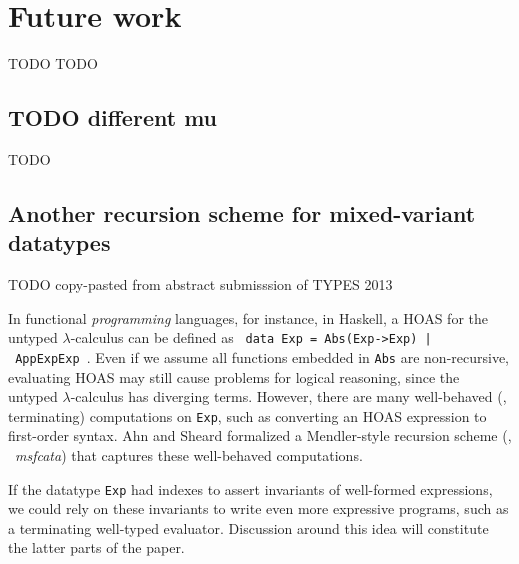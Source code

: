 \chapter{Future work}\label{ch:futwork} TODO
TODO


\section{TODO different mu}\label{sec:futwork:mu}
TODO

\section{Another recursion scheme for mixed-variant datatypes}
\label{sec:futwork:mprsi}
TODO copy-pasted from abstract submisssion of TYPES 2013

\newcommand{\mprsi}[0]{\textbf{mprsi}}

In functional \emph{programming} languages, for instance, in Haskell,
a HOAS for the untyped $\lambda$-calculus can be defined as
{\small\texttt{\,data Exp~=~Abs\;(Exp\;->\;Exp)~|~App\;Exp\;Exp\,}}.
Even if we assume all functions embedded in \texttt{Abs} are non-recursive,
evaluating HOAS may still cause problems for logical reasoning,
since the untyped $\lambda$-calculus has diverging terms. However, there are
many well-behaved (\ie, terminating) computations on \texttt{Exp}, such as
converting an HOAS expression to first-order syntax.
Ahn and Sheard \cite{AhnShe11} formalized a Mendler-style recursion scheme
(\MsfIt, \aka\ \textit{msfcata}) that captures these well-behaved computations.

If the datatype \texttt{Exp} had indexes to assert invariants of
well-formed expressions, we could rely on these invariants to write
even more expressive programs, such as a terminating well-typed evaluator.
Discussion around this idea will constitute the latter parts of the paper.
\vspace*{-2ex}
